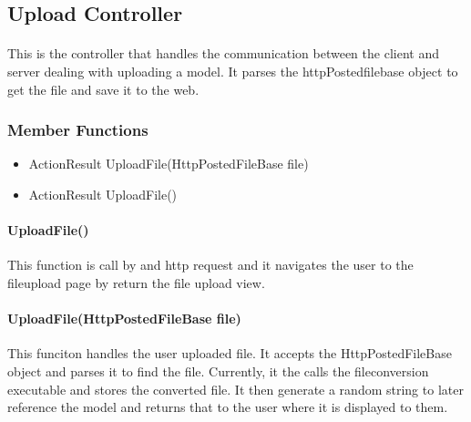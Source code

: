 \hypertarget{website_UploadController}
{
    \label{website_UploadController}
}

\subsection{Upload Controller}
    \paragraph{}
        This is the controller that handles the communication between the client and server dealing with uploading a model.
        It parses the httpPostedfilebase object to get the file and save it to the web.


    \subsubsection{Member Functions}

        \begin{itemize}
            \item ActionResult UploadFile(HttpPostedFileBase file)
            \item ActionResult UploadFile()
        \end{itemize}

        \paragraph{UploadFile()}
            \hfill \break
            This function is call by and http request and it navigates the user to the fileupload page by return the file upload view.
    

        \paragraph{UploadFile(HttpPostedFileBase file)}
            \hfill \break
            This funciton handles the user uploaded file.
            It accepts the HttpPostedFileBase object and parses it to find the file.
            Currently, it the calls the fileconversion executable and stores the converted file.
            It then generate a random string to later reference the model and returns that to the user where it is displayed to them.

        
        